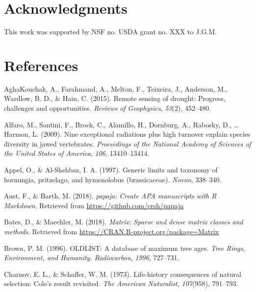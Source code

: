 \documentclass[man,floatsintext]{apa6}
\theoremstyle{definition}
\theoremstyle{definition}
\theoremstyle{definition}
\theoremstyle{remark}
\begin{document}
\hypertarget{acknowledgments}{%
\section{Acknowledgments}\label{acknowledgments}}

This work was supported by NSF no. USDA grant no. XXX to J.G.M.

\hypertarget{references}{%
\section{References}\label{references}}

\newpage

\begingroup
\setlength{\parindent}{-0.5in}
\setlength{\leftskip}{0.5in}

\hypertarget{refs}{}
\leavevmode\hypertarget{ref-aghakouchak2015remote}{}%
AghaKouchak, A., Farahmand, A., Melton, F., Teixeira, J., Anderson, M.,
Wardlow, B. D., \& Hain, C. (2015). Remote sensing of drought: Progress,
challenges and opportunities. \emph{Reviews of Geophysics},
\emph{53}(2), 452--480.

\leavevmode\hypertarget{ref-R-geiger_a}{}%
Alfaro, M., Santini, F., Brock, C., Alamillo, H., Dornburg, A., Rabosky,
D., \ldots{} Harmon, L. (2009). Nine exceptional radiations plus high
turnover explain species diversity in jawed vertebrates.
\emph{Proceedings of the National Academy of Sciences of the United
States of America}, \emph{106}, 13410--13414.

\leavevmode\hypertarget{ref-appel1997generic}{}%
Appel, O., \& Al-Shehbaz, I. A. (1997). Generic limits and taxonomy of
hornungia, pritzelago, and hymenolobus (brassicaceae). \emph{Novon},
338--340.

\leavevmode\hypertarget{ref-R-papaja}{}%
Aust, F., \& Barth, M. (2018). \emph{papaja: Create APA manuscripts with
R Markdown}. Retrieved from \url{https://github.com/crsh/papaja}

\leavevmode\hypertarget{ref-R-Matrix}{}%
Bates, D., \& Maechler, M. (2018). \emph{Matrix: Sparse and dense matrix
classes and methods}. Retrieved from
\url{https://CRAN.R-project.org/package=Matrix}

\leavevmode\hypertarget{ref-brown1996oldlist}{}%
Brown, P. M. (1996). OLDLIST: A database of maximum tree ages.
\emph{Tree Rings, Environment, and Humanity. Radiocarbon}, \emph{1996},
727--731.

\leavevmode\hypertarget{ref-charnov1973life}{}%
Charnov, E. L., \& Schaffer, W. M. (1973). Life-history consequences of
natural selection: Cole's result revisited. \emph{The American
Naturalist}, \emph{107}(958), 791--793.
\end{document}
